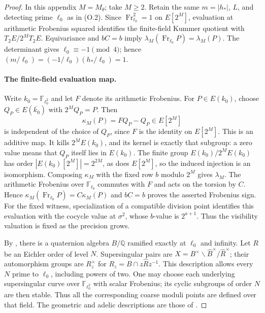 \documentclass[11pt]{article}
\theoremstyle{definition}
\theoremstyle{remark}
\begin{document}
\begin{proof}\leavevmode
In this appendix $M=M_\theta$; take $M\geq2$.  Retain the
same $m=|h_*|$, $L$, and detecting prime $\ell_0$ as in (O.2).
Since $\operatorname{Fr}_{\ell_0}^2=1$ on $E[2^M]$, evaluation at
arithmetic Frobenius squared identifies the finite-field Kummer
quotient with $T_2E/2^M T_2E$.  Equivariance and $bC=b$ imply
$\lambda_M(\operatorname{Fr}_{\ell_0} P)=\lambda_M(P)$.
The determinant gives $\ell_0\equiv-1\pmod4$; hence
$(m/\ell_0)=(-1/\ell_0)(h_*/\ell_0)=1$.
\paragraph{The finite-field evaluation map.}
Write $k_0=\mathbb F_{\ell_0^2}$ and let $F$ denote its arithmetic
Frobenius. For $P\in E(k_0)$, choose $Q_P\in E(\overline{k_0})$
with $2^M Q_P=P$. Then
\[
 \kappa_M(P)=FQ_P-Q_P\in E[2^M]
\]
is independent of the choice of $Q_P$, since $F$ is the identity
on $E[2^M]$. This is an additive map. It kills $2^ME(k_0)$,
and its kernel is exactly that subgroup: a zero value means that
$Q_P$ itself lies in $E(k_0)$. The finite group
$E(k_0)/2^ME(k_0)$ has order $|E(k_0)[2^M]|=2^{2M}$, as does
$E[2^M]$, so the induced injection is an isomorphism.
Composing $\kappa_M$ with the fixed row $b$ modulo $2^M$ gives
$\lambda_M$. The arithmetic Frobenius over $\mathbb F_{\ell_0}$
commutes with $F$ and acts on the torsion by $C$. Hence
$\kappa_M(\operatorname{Fr}_{\ell_0}P)=C\kappa_M(P)$ and
$bC=b$ proves the asserted Frobenius sign.
For the fixed witness, specialization of a compatible division
point identifies this evaluation with the cocycle value at
$\sigma^2$, whose $b$-value is $2^{a+1}$. Thus the visibility
valuation is fixed as the precision grows.

By \cite[Main Theorem 14.6.1]{voight-quaternion}, there is a quaternion
algebra $B/\mathbb Q$ ramified exactly at $\ell_0$ and infinity.
Let $R$ be an Eichler
order of level $N$.  Supersingular pairs are
$X=B^\times\backslash\widehat B^\times/\widehat R^\times$;
their automorphism groups are $R_z^\times$ for
$R_z=B\cap z\widehat Rz^{-1}$.  This description allows every
$N$ prime to $\ell_0$, including powers of two.  One may choose each
underlying supersingular curve over $\mathbb F_{\ell_0^2}$ with scalar
Frobenius; its cyclic subgroups of order $N$ are then stable.  Thus
all the corresponding coarse moduli points are defined over that
field.  The geometric and adelic descriptions are those of
\cite[Sections 1.1--1.2 and 2.5]{jetchevkane}.


\end{proof}
\end{document}
